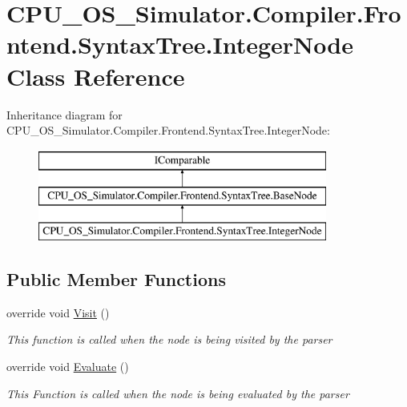 \hypertarget{class_c_p_u___o_s___simulator_1_1_compiler_1_1_frontend_1_1_syntax_tree_1_1_integer_node}{}\section{C\+P\+U\+\_\+\+O\+S\+\_\+\+Simulator.\+Compiler.\+Frontend.\+Syntax\+Tree.\+Integer\+Node Class Reference}
\label{class_c_p_u___o_s___simulator_1_1_compiler_1_1_frontend_1_1_syntax_tree_1_1_integer_node}
Inheritance diagram for C\+P\+U\+\_\+\+O\+S\+\_\+\+Simulator.\+Compiler.\+Frontend.\+Syntax\+Tree.\+Integer\+Node\+:\begin{figure}[H]
\begin{center}
\leavevmode
\includegraphics[height=3.000000cm]{class_c_p_u___o_s___simulator_1_1_compiler_1_1_frontend_1_1_syntax_tree_1_1_integer_node}
\end{center}
\end{figure}
\subsection*{Public Member Functions}
\begin{DoxyCompactItemize}
\item 
override void \hyperlink{class_c_p_u___o_s___simulator_1_1_compiler_1_1_frontend_1_1_syntax_tree_1_1_integer_node_a5f788c73bf459d372850107098fda8c1}{Visit} ()
\begin{DoxyCompactList}\small\item\em This function is called when the node is being visited by the parser \end{DoxyCompactList}\item 
override void \hyperlink{class_c_p_u___o_s___simulator_1_1_compiler_1_1_frontend_1_1_syntax_tree_1_1_integer_node_a3005d7165ec473ac488e792728a50d99}{Evaluate} ()
\begin{DoxyCompactList}\small\item\em This Function is called when the node is being evaluated by the parser \end{DoxyCompactList}\end{DoxyCompactItemize}
